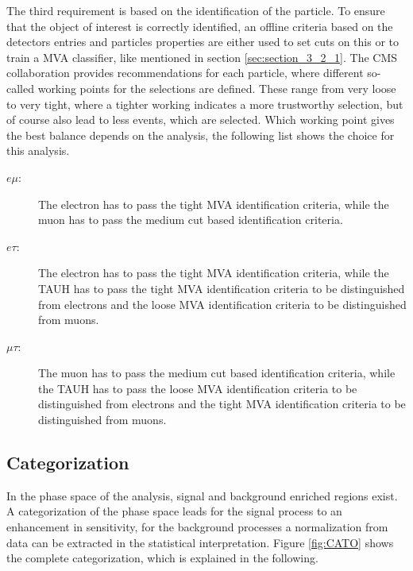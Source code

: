 The third requirement is based on the identification of the particle. To ensure that the object of interest is correctly identified, an offline criteria based on the detectors entries and particles properties are either used to set cuts on this or to train a \gls{MVA} classifier, like mentioned in section \ref{sec:section_3_2_1}. The \gls{CMS} collaboration provides recommendations for each particle, where different so-called working points for the selections are defined. These range from very loose to very tight, where a tighter working indicates a more trustworthy selection, but of course also lead to less events, which are selected. Which working point gives the best balance depends on the analysis, the following list shows the choice for this analysis. 

\begin{description}
	\item [$e\mu$:] The electron has to pass the tight \gls{MVA} identification criteria, while the muon has to pass the medium cut based identification criteria. 
	\item [$e\tau$:]  The electron has to pass the tight \gls{MVA} identification criteria, while the \gls{TAUH} has to pass the tight \gls{MVA} identification criteria to be distinguished from electrons and the loose \gls{MVA} identification criteria to be distinguished from muons.
	\item [$\mu\tau$:]  The muon has to pass the medium cut based identification criteria, while the \gls{TAUH} has to pass the loose \gls{MVA} identification criteria to be distinguished from electrons and the tight \gls{MVA} identification criteria to be distinguished from muons.
\end{description}


\subsection{Categorization}
\label{sec:section_3_2_3}

In the phase space of the analysis, signal and background enriched regions exist. A categorization of the phase space leads for the signal process to an enhancement in sensitivity, for the background processes a normalization from data can be extracted in the statistical interpretation. Figure \ref{fig:CATO} shows the complete categorization, which is explained in the following. \\


